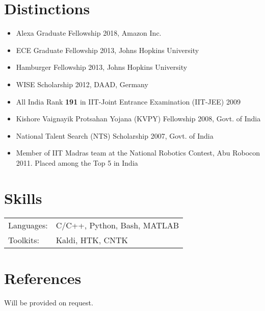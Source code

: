 \documentclass[margin,line,pifont,palatino,courier]{res}
\begin{document}
\begin{resume}
\section{\sc Distinctions}
\begin{itemize} \itemsep -2pt
    \item Alexa Graduate Fellowship 2018, Amazon Inc.
    \item ECE Graduate Fellowship 2013, Johns Hopkins University
    \item Hamburger Fellowship 2013, Johns Hopkins University
    \item WISE Scholarship 2012, DAAD, Germany
    \item All India Rank \textbf{191} in {IIT-Joint Entrance Examination (IIT-JEE)} 2009%
    \item Kishore Vaignayik Protsahan Yojana (KVPY) Fellowship 2008, Govt. of India %
    \item National Talent Search (NTS) Scholarship 2007, Govt. of India %
    \item Member of IIT Madras team at the National Robotics Contest, Abu Robocon 2011. Placed among the Top 5 in India
  \end{itemize}

\section{\sc Skills}

\begin{tabular}{@{}p{0.8in}p{6in}}

Languages:& C/C++, Python, Bash, MATLAB\\
Toolkits: & Kaldi, HTK, CNTK \\

\end{tabular}

\section{\sc References}

Will be provided on request.

\end{resume}
\end{document}
